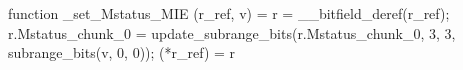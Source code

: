 function _set_Mstatus_MIE (r_ref, v) = {
    r = __bitfield_deref(r_ref);
    r.Mstatus_chunk_0 = update_subrange_bits(r.Mstatus_chunk_0, 3, 3, subrange_bits(v, 0, 0));
    (*r_ref) = r
}
